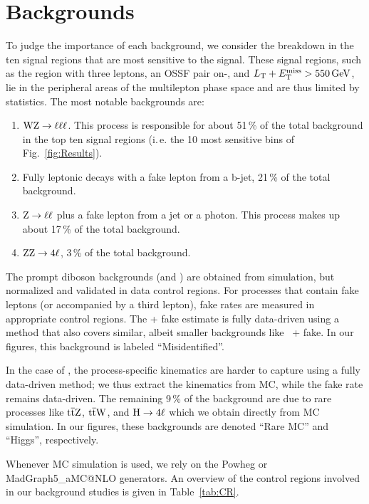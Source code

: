 \chapter{Backgrounds}
\label{chap:Backgrounds}

To judge the importance of each background, we consider the breakdown in the ten signal regions that are most sensitive to the signal. These signal regions, such as the region with three leptons, an OSSF pair on-\Z, and $L_\textrm{T} + E_{\mathrm{T}}^{\text{miss}} > 550\,\text{Ge\hspace{-.08em}V}$, lie in the peripheral areas of the multilepton phase space and are thus limited by statistics. The most notable backgrounds are:
\begin{enumerate}
	\item $\mathrm{W}\mathrm{Z} \to \ell\ell\ell$. This process is responsible for about 51\,\% of the total background in the top ten signal regions (i.\,e. the 10 most sensitive bins of Fig.~\ref{fig:Results}).
	\item Fully leptonic \ttbar decays with a fake lepton from a b-jet, 21\,\% of the total background.
	\item $\mathrm{Z} \to \ell\ell$ plus a fake lepton from a jet or a photon. This process makes up about 17\,\% of the total background.
	\item $\mathrm{Z}\mathrm{Z} \to 4\ell$, 3\,\% of the total background.
\end{enumerate}

The prompt diboson backgrounds (\WZ and \ZZ) are obtained from simulation, but normalized and validated in data control regions. For processes that contain fake leptons (\Z or \ttbar accompanied by a third lepton), fake rates are measured in appropriate control regions. The \Z + fake estimate is fully data-driven using a method that also covers similar, albeit smaller backgrounds like \PW\PW\ + fake. In our figures, this background is labeled ``Misidentified''.

In the case of \ttbar, the process-specific kinematics are harder to capture using a fully data-driven method; we thus extract the kinematics from MC, while the fake rate remains data-driven. The remaining 9\,\% of the background are due to rare processes like $\mathrm{t}\overline{\mathrm{t}}\mathrm{Z}$, $\mathrm{t}\overline{\mathrm{t}}\mathrm{W}$, and $\mathrm{H} \to 4\ell$ which we obtain directly from MC simulation. In our figures, these backgrounds are denoted ``Rare MC'' and ``Higgs'', respectively.

Whenever MC simulation is used, we rely on the Powheg or MadGraph5\_aMC@NLO generators. An overview of the control regions involved in our background studies is given in Table~\ref{tab:CR}.

